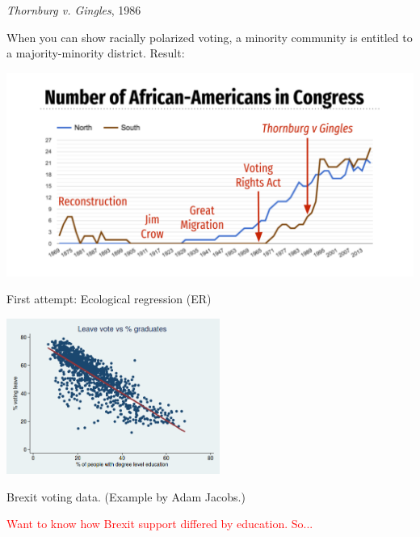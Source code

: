 \documentclass[
  ignorenonframetext,
]{beamer}
\begin{document}
\begin{frame}{\emph{Thornburg v. Gingles}, 1986}
\protect\hypertarget{thornburg-v.-gingles-1986}{}

When you can show racially polarized voting, a minority community is
entitled to a majority-minority district. Result:

\includegraphics{defense_files/figure-beamer/unnamed-chunk-21-1.pdf}

\end{frame}

\begin{frame}{First attempt: Ecological regression (ER)}
\protect\hypertarget{first-attempt-ecological-regression-er}{}

\includegraphics[width=\textwidth,height=2in]{brexit_ER.png}

Brexit voting data. (Example by Adam Jacobs.)

\textcolor{red}{{\scriptsize Want to know how Brexit support differed by education. So...}}

\end{frame}
\end{document}
